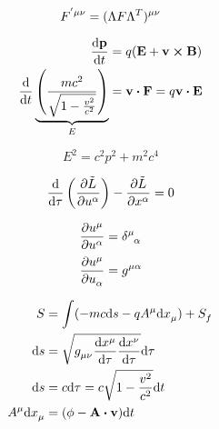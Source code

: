 \documentclass[11pt,twoside]{article}
\begin{document}
\begin{multicols}{3}
\begin{footnotesize}
\begin{equation}
F\indices{^{'\mu\nu}} = (\Lambda F \Lambda^T)\indices{^{\mu\nu}}
\end{equation}

\begin{equation}
\begin{split}
\dv{\vb{p}}{t}&=q(\vb{E}+\vb{v}\cross\vb{B})\\
\dv{t}\underbrace{\left(\frac{mc^2}{\sqrt{1-\frac{v^2}{c^2}}} \right)}_{E} &= \vb{v}\vdot\vb{F} = q\vb{v}\vdot\vb{E}
\end{split}
\end{equation}

\begin{equation}
E^2 = c^2p^2+m^2c^4
\end{equation}

\begin{equation}
\dv{\tau}\left(\pdv{\tilde{L}}{u\indices{^\alpha}} \right) - \pdv{\tilde{L}}{x\indices{^\alpha}} = 0
\end{equation}

\begin{equation}
\begin{split}
\pdv{u\indices{^\mu}}{u\indices{^\alpha}}&=\delta\indices{^\mu_\alpha} \\
\pdv{u\indices{^\mu}}{u\indices{_\alpha}}&=g\indices{^{\mu\alpha}}
\end{split}
\end{equation}

\begin{equation}
\begin{split}
S &= \int (-mc\dd s - qA\indices{^\mu}\dd x\indices{_\mu}) + S\indices{_f} \\
\dd s &= \sqrt{g\indices{_{\mu\nu}}\dv{x\indices{^\mu}}{\tau}\dv{x\indices{^\nu}}{\tau}} \dd \tau \\
\dd s &= c \dd \tau = c \sqrt{1-\frac{v^2}{c^2}}\dd t \\
A\indices{^\mu}\dd x\indices{_\mu} &= (\phi - \vb{A}\vdot\vb{v})\dd t
\end{split}
\end{equation}

\end{footnotesize}
\end{multicols}
\end{document}
